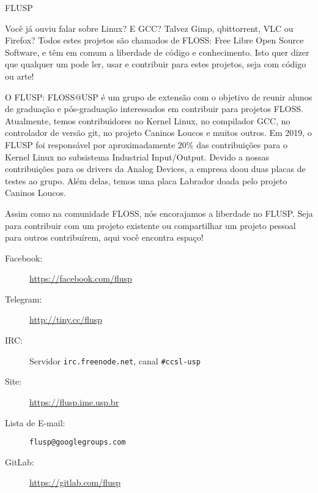 \begin{subsecao}{FLUSP}


Você já ouviu falar sobre Linux? E GCC? Talvez Gimp, qbittorrent, VLC ou Firefox?
Todos estes projetos são chamados de FLOSS: Free Libre Open Source Software, e
têm em comum a liberdade de código e conhecimento. Isto quer dizer que qualquer
um pode ler, usar e contribuir para estes projetos, seja com código ou arte!

O FLUSP: FLOSS@USP é um grupo de extensão com o objetivo de reunir alunos de
graduação e pós-graduação interessados em contribuir para projetos FLOSS.
Atualmente, temos contribuidores no Kernel Linux, no compilador GCC, no controlador
de versão git, no projeto Caninos Loucos e muitos outros. Em 2019, o FLUSP
foi responsável por aproximadamente 20\% das contribuições para o Kernel Linux no
subsistema Industrial Input/Output. Devido a nossas contribuições para os drivers
da Analog Devices, a empresa doou duas placas de testes ao grupo. Além delas, temos
uma placa Labrador doada pelo projeto Caninos Loucos.

Assim como na comunidade FLOSS, nós encorajamos a liberdade no FLUSP. Seja para
contribuir com um projeto existente ou compartilhar um projeto pessoal para
outros contribuírem, aqui você encontra espaço!

\begin{description}
  \item[Facebook:] \url{https://facebook.com/flusp}
  \item[Telegram:] \url{http://tiny.cc/flusp}
  \item[IRC:] Servidor \texttt{irc.freenode.net}, canal \texttt{\#ccsl-usp}
  \item[Site:] \url{https://flusp.ime.usp.br}
  \item[Lista de E-mail:] \texttt{flusp@googlegroups.com}
  \item[GitLab:] \url{https://gitlab.com/flusp}
\end{description}

\end{subsecao}
